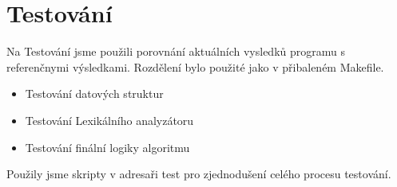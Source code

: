 \section{Testování}

Na Testování jsme použili porovnání aktuálních vysledků programu s referenčnymi výsledkami.
Rozdělení bylo použité jako v přibaleném Makefile.

\begin{itemize}
    \item Testování datových struktur
    \item Testování Lexikálního analyzátoru
    \item Testování finální logiky algoritmu
\end{itemize}

Použily jsme skripty v adresaři test pro zjednodušení celého procesu testování.
